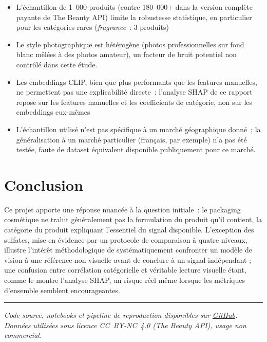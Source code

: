 \documentclass[11pt,a4paper]{article}
\begin{document}
\begin{itemize}[leftmargin=1.5em]
  \item L'échantillon de 1~000 produits (contre 180~000+ dans la version complète payante de The Beauty API) limite la robustesse statistique, en particulier pour les catégories rares (\emph{fragrance}~: 3 produits)
  \item Le style photographique est hétérogène (photos professionnelles sur fond blanc mêlées à des photos amateur), un facteur de bruit potentiel non contrôlé dans cette étude.
  \item Les embeddings CLIP, bien que plus performants que les features manuelles, ne permettent pas une explicabilité directe~: l'analyse SHAP de ce rapport repose sur les features manuelles et les coefficients de catégorie, non sur les embeddings eux-mêmes
  \item L'échantillon utilisé n'est pas spécifique à un marché géographique donné~; la généralisation à un marché particulier (français, par exemple) n'a pas été testée, faute de dataset équivalent disponible publiquement pour ce marché.
\end{itemize}

\section{Conclusion}

Ce projet apporte une réponse nuancée à la question initiale~: le packaging cosmétique ne trahit généralement pas la formulation du produit qu'il contient, la catégorie du produit expliquant l'essentiel du signal disponible. L'exception des sulfates, mise en évidence par un protocole de comparaison à quatre niveaux, illustre l'intérêt méthodologique de systématiquement confronter un modèle de vision à une référence non visuelle avant de conclure à un signal indépendant ; une confusion entre corrélation catégorielle et véritable lecture visuelle étant, comme le montre l'analyse SHAP, un risque réel même lorsque les métriques d'ensemble semblent encourageantes.

\vspace{2em}
\noindent\rule{\textwidth}{0.4pt}
\small
\noindent\textit{Code source, notebooks et pipeline de reproduction disponibles sur \href{https://github.com/elisemyr}{GitHub}. Données utilisées sous licence CC~BY-NC~4.0 (The Beauty API), usage non commercial.}
\end{document}
